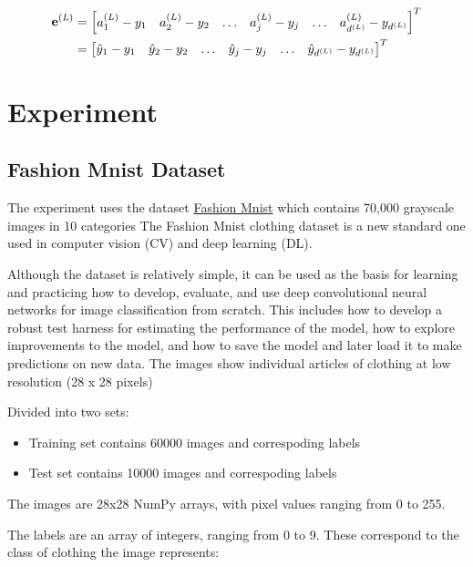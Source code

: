 \documentclass[14pt, a4paper]{article}
\numberwithin{equation}{section}
\numberwithin{algorithm}{section}
\numberwithin{figure}{section}
\begin{document}
\begin{equation}
  \begin{aligned}
    \bold{e}^{(L)}&=\begin{bmatrix} a_1^{(L)} - y_1 & a_2^{(L)} - y_2 & \dots & a_j^{(L)} - y_j & \dots & a_{d^{(L)}}^{(L)} - y_{d^{(L)}} \end{bmatrix}^T\\&=\begin{bmatrix} \hat{y}_1 - y_1 & \hat{y}_2 - y_2 & \dots & \hat{y}_j - y_j & \dots & \hat{y}_{d^{(L)}} - y_{d^{(L)}} \end{bmatrix}^T
  \end{aligned}
\end{equation}

\section{Experiment}

\subsection{Fashion Mnist Dataset}

The experiment uses the dataset \href{https://github.com/zalandoresearch/fashion-mnist}{Fashion Mnist} which contains 70,000 grayscale images in 10 categories
The Fashion Mnist clothing dataset is a new standard one used in computer vision (CV) and deep learning (DL).

Although the dataset is relatively simple, it can be used as the basis for learning and practicing how to develop, evaluate, and use deep convolutional neural networks for image classification from scratch. 
This includes how to develop a robust test harness for estimating the performance of the model, how to explore improvements to the model, and how to save the model and later load it to make predictions on new data.
The images show individual articles of clothing at low resolution (28 x 28 pixels)

Divided into two sets:
\begin{itemize}
	  \item Training set contains 60000 images and correspoding labels
		\item Test set contains 10000 images and correspoding labels
\end{itemize}

The images are 28x28 NumPy arrays, with pixel values ranging from 0 to 255. 
	
The labels are an array of integers, ranging from 0 to 9. These correspond to the class of clothing the image represents:
\end{document}
